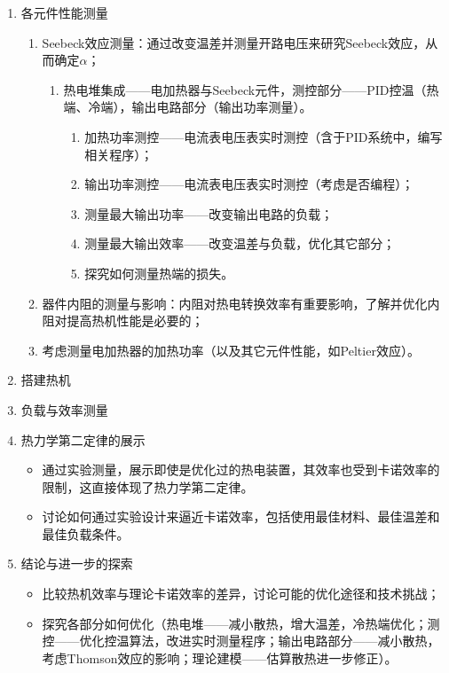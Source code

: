 \begin{enumerate}
	\item 各元件性能测量
	\begin{enumerate}
		\item \textcolor{fred}{Seebeck效应测量}：通过改变温差并测量开路电压来研究Seebeck效应，从而确定$\alpha$；
		\begin{enumerate}
			\item \textcolor{fred}{热电堆集成——电加热器与Seebeck元件，测控部分——PID控温（热端、冷端），输出电路部分（输出功率测量）。}
			\begin{enumerate}
				\item \textcolor{fred}{加热功率测控}——电流表电压表实时测控（含于PID系统中，编写相关程序）；
				\item \textcolor{fred}{输出功率测控}——电流表电压表实时测控（考虑是否编程）；
				\item 测量最大输出功率——改变输出电路的负载；
				\item 测量最大输出效率——改变温差与负载，优化其它部分；
				\item 探究如何测量热端的损失。
			\end{enumerate}
		\end{enumerate}
		\item 器件内阻的测量与影响：内阻对热电转换效率有重要影响，了解并优化内阻对提高热机性能是必要的；
		\item 考虑测量电加热器的加热功率（以及其它元件性能，如Peltier效应）。
	\end{enumerate}
	
	\item \textcolor{fred}{搭建热机}
	
	\item 负载与效率测量
	
	
	\item 热力学第二定律的展示
	\begin{itemize}
		\item \textcolor{fred}{通过实验测量，展示即使是优化过的热电装置，其效率也受到卡诺效率的限制，这直接体现了热力学第二定律。}
		\item 讨论如何通过实验设计来逼近卡诺效率，包括使用最佳材料、最佳温差和最佳负载条件。
	\end{itemize}			
	
	\item 结论与进一步的探索
	\begin{itemize}
		\item 比较热机效率与理论卡诺效率的差异，讨论可能的优化途径和技术挑战；
		\item 探究各部分如何\textcolor{fred}{优化}（热电堆——减小散热，增大温差，冷热端优化；测控——优化控温算法，改进实时测量程序；输出电路部分——减小散热，考虑Thomson效应的影响；理论建模——估算散热进一步修正）。
	\end{itemize}
\end{enumerate}

